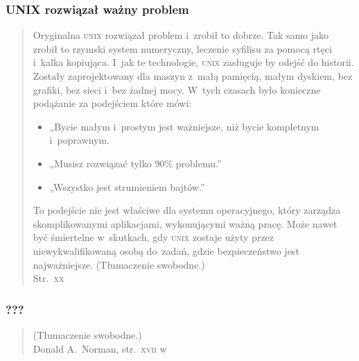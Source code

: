 \documentclass[10pt,t]{beamer}
\begin{document}
\begin{frame}
  \frametitle{UNIX rozwiązał ważny problem}


  \begin{quote}

    Oryginalna \textsc{unix} rozwiązał problem i~zrobił to dobrze. Tak samo
    jako
    zrobił to rzymski system numeryczny, leczenie syfilisu za pomocą rtęci
    i~kalka kopiująca. I~jak te technologie, \textsc{unix} zasługuje by
    odejść do
    historii. Zostały zaprojektowany dla maszyn z~małą pamięcią, małym
    dyskiem, bez grafiki, bez sieci i~bez żadnej mocy. W~tych czasach było
    konieczne podążanie za podejściem które mówi:

    \vspace{-0.3em}



    \begin{itemize}

    \item „Bycie małym i~prostym jest ważniejsze, niż bycie kompletnym
      i~poprawnym.

    \item „Musisz rozwiązać tylko 90\% problemu.”

    \item „Wszystko jest strumieniem bajtów.”

    \end{itemize}
    To podejście nie jest właściwe dla systemu operacyjnego, który zarządza
    skomplikowanymi aplikacjami, wykonującymi ważną pracę. Może nawet być
    śmiertelne w~skutkach, gdy \textsc{unix} zostaje użyty przez
    niewykwalifikowaną
    osobą do~zadań, gdzie bezpieczeństwo jest najważniejsze.
    (Tłumaczenie swobodne.) \\
    Str.~\textsc{xx}
    \parencite{Garfinkel-Weise-Strassmann-The-UNIX-HATERS-Handbook-Pub-1994}

  \end{quote}

\end{frame}





\begin{frame}
  \frametitle{???}


  \begin{quote}


    (Tłumaczenie swobodne.) \\
    Donald A.~Norman, str.~\textsc{xvii}
    w~\parencite{Garfinkel-Weise-Strassmann-The-UNIX-HATERS-Handbook-Pub-1994}

  \end{quote}

\end{frame}
\end{document}
